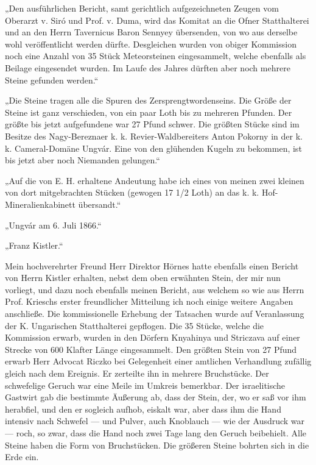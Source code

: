 \documentclass[a4paper, 11pt, oneside, german]{article}
\begin{document}
„Den ausführlichen Bericht, samt gerichtlich aufgezeichneten Zeugen vom Oberarzt v. Siró und Prof. v. Duma, wird das Komitat an die Ofner Statthalterei und an den Herrn Tavernicus Baron Sennyey übersenden, von wo aus derselbe wohl veröffentlicht werden dürfte. Desgleichen wurden von obiger Kommission noch eine Anzahl von 35 Stück Meteorsteinen eingesammelt, welche ebenfalls als Beilage eingesendet wurden. Im Laufe des Jahres dürften aber noch mehrere Steine gefunden werden.“

„Die Steine tragen alle die Spuren des Zersprengtwordenseins. Die Größe der Steine ist ganz verschieden, von ein paar Loth bis zu mehreren Pfunden. Der größte bis jetzt aufgefundene war 27 Pfund schwer. Die größten Stücke sind im Besitze des Nagy-Bereznaer k. k. Revier-Waldbereiters Anton Pokorny in der k. k. Cameral-Domäne Ungvár. Eine von den glühenden Kugeln zu bekommen, ist bis jetzt aber noch Niemanden gelungen.“

„Auf die von E. H. erhaltene Andeutung habe ich eines von meinen zwei kleinen von dort mitgebrachten Stücken (gewogen 17 1/2 Loth) an das k. k. Hof-Mineralienkabinett übersandt.“

\hspace*{10mm}„Ungvár am 6. Juli 1866.“

\hspace*{20mm}„Franz Kistler.“

Mein hochverehrter Freund Herr Direktor Hörnes hatte ebenfalls einen Bericht von Herrn Kistler erhalten, nebst dem oben erwähnten Stein, der mir nun vorliegt, und dazu noch ebenfalls meinen Bericht, aus welchem so wie aus Herrn Prof. Krieschs erster freundlicher Mitteilung ich noch einige weitere Angaben anschließe. Die kommissionelle Erhebung der Tatsachen wurde auf Veranlassung der K. Ungarischen Statthalterei gepflogen. Die 35 Stücke, welche die Kommission erwarb, wurden in den Dörfern Knyahinya und Striczava auf einer Strecke von 600 Klafter Länge eingesammelt. Den größten Stein von 27 Pfund erwarb Herr Advocat Riczko bei Gelegenheit einer amtlichen Verhandlung zufällig gleich nach dem Ereignis. Er zerteilte ihn in mehrere Bruchstücke. Der schwefelige Geruch war eine Meile im Umkreis bemerkbar. Der israelitische Gastwirt gab die bestimmte Äußerung ab, dass der Stein, der, wo er saß vor ihm herabfiel, und den er sogleich aufhob, eiskalt war, aber dass ihm die Hand intensiv nach Schwefel --- und Pulver, auch Knoblauch --- wie der Ausdruck war --- roch, so zwar, dass die Hand noch zwei Tage lang den Geruch beibehielt. Alle Steine haben die Form von Bruchstücken. Die größeren Steine bohrten sich in die Erde ein.
\end{document}

